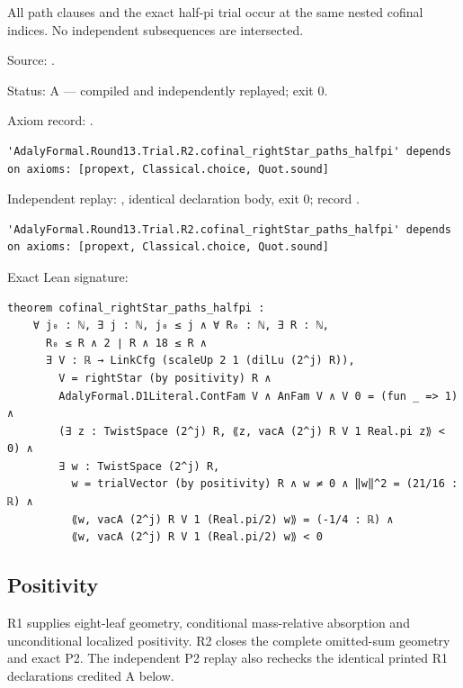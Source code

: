 \begin{theorem}[bp-437]
\label{bp-437}
\leanok
All path clauses and the exact half-pi trial occur at the same nested cofinal indices. No independent subsequences are intersected.

\par Source: \texttt{}.
\par Status: A — compiled and independently replayed; exit 0.
\par Axiom record: \texttt{}.
\begin{verbatim}
'AdalyFormal.Round13.Trial.R2.cofinal_rightStar_paths_halfpi' depends on axioms: [propext, Classical.choice, Quot.sound]
\end{verbatim}
\par Independent replay: \texttt{}, identical declaration body, exit 0; record \texttt{}.
\begin{verbatim}
'AdalyFormal.Round13.Trial.R2.cofinal_rightStar_paths_halfpi' depends on axioms: [propext, Classical.choice, Quot.sound]
\end{verbatim}
\par Exact Lean signature:
\begin{verbatim}
theorem cofinal_rightStar_paths_halfpi :
    ∀ j₀ : ℕ, ∃ j : ℕ, j₀ ≤ j ∧ ∀ R₀ : ℕ, ∃ R : ℕ,
      R₀ ≤ R ∧ 2 ∣ R ∧ 18 ≤ R ∧
      ∃ V : ℝ → LinkCfg (scaleUp 2 1 (dilLu (2^j) R)),
        V = rightStar (by positivity) R ∧
        AdalyFormal.D1Literal.ContFam V ∧ AnFam V ∧ V 0 = (fun _ => 1) ∧
        (∃ z : TwistSpace (2^j) R, ⟪z, vacA (2^j) R V 1 Real.pi z⟫ < 0) ∧
        ∃ w : TwistSpace (2^j) R,
          w = trialVector (by positivity) R ∧ w ≠ 0 ∧ ‖w‖^2 = (21/16 : ℝ) ∧
          ⟪w, vacA (2^j) R V 1 (Real.pi/2) w⟫ = (-1/4 : ℝ) ∧
          ⟪w, vacA (2^j) R V 1 (Real.pi/2) w⟫ < 0
\end{verbatim}
\end{theorem}

\subsection{Positivity}

R1 supplies eight-leaf geometry, conditional mass-relative absorption and unconditional localized positivity. R2 closes the complete omitted-sum geometry and exact P2. The independent P2 replay also rechecks the identical printed R1 declarations credited A below.

